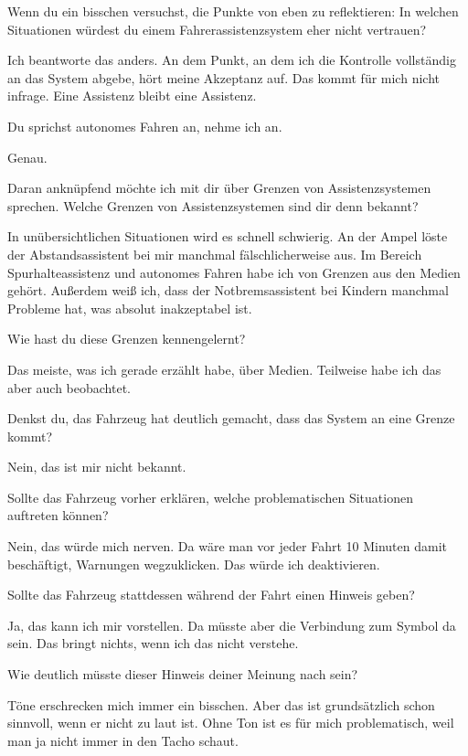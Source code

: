 \interviewerin
Wenn du ein bisschen versuchst, die Punkte von eben zu reflektieren: In
welchen Situationen würdest du einem Fahrerassistenzsystem eher nicht
vertrauen?

Ich beantworte das anders. An dem Punkt, an dem ich die Kontrolle
vollständig an das System abgebe, hört meine Akzeptanz auf. Das kommt
für mich nicht infrage. Eine Assistenz bleibt eine Assistenz.

\interviewerin
Du sprichst autonomes Fahren an, nehme ich an.

Genau.

\interviewerin
Daran anknüpfend möchte ich mit dir über Grenzen von Assistenzsystemen
sprechen. Welche Grenzen von Assistenzsystemen sind dir denn bekannt?

In unübersichtlichen Situationen wird es schnell schwierig. An der
Ampel löste der Abstandsassistent bei mir manchmal fälschlicherweise
aus. Im Bereich Spurhalteassistenz und autonomes Fahren habe ich von
Grenzen aus den Medien gehört. Außerdem weiß ich, dass der
Notbremsassistent bei Kindern manchmal Probleme hat, was absolut
inakzeptabel ist.

\interviewerin
Wie hast du diese Grenzen kennengelernt?

Das meiste, was ich gerade erzählt habe, über Medien. Teilweise habe ich
das aber auch beobachtet.

\interviewerin
Denkst du, das Fahrzeug hat deutlich gemacht, dass das System an eine
Grenze kommt?

Nein, das ist mir nicht bekannt.

\interviewerin
Sollte das Fahrzeug vorher erklären, welche problematischen Situationen
auftreten können?

Nein, das würde mich nerven. Da wäre man vor jeder Fahrt 10 Minuten
damit beschäftigt, Warnungen wegzuklicken. Das würde ich deaktivieren.

\interviewerin
Sollte das Fahrzeug stattdessen während der Fahrt einen Hinweis geben?

Ja, das kann ich mir vorstellen. Da müsste aber die Verbindung zum
Symbol da sein. Das bringt nichts, wenn ich das nicht verstehe.

\interviewerin
Wie deutlich müsste dieser Hinweis deiner Meinung nach sein?

Töne erschrecken mich immer ein bisschen. Aber das ist grundsätzlich
schon sinnvoll, wenn er nicht zu laut ist. Ohne Ton ist es für mich
problematisch, weil man ja nicht immer in den Tacho schaut.

